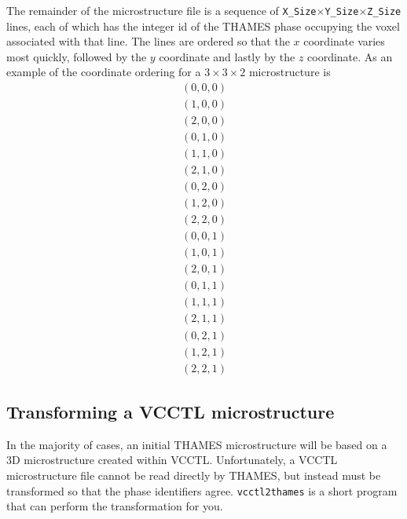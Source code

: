\documentclass{article}
\begin{document}
The remainder of the microstructure file is a sequence of
\verb!X_Size!$\times$\verb!Y_Size!$\times$\verb!Z_Size! lines, each of which has
the integer id of the THAMES phase occupying
the voxel associated with that line.  The lines are ordered so that the $x$
coordinate varies most quickly, followed by the $y$ coordinate and lastly by
the $z$ coordinate.  As an example of the coordinate ordering for a $3 \times 3 \times 2$
microstructure is
\begin{align*}
(0,0,0) \\
(1,0,0) \\
(2,0,0) \\
(0,1,0) \\
(1,1,0) \\
(2,1,0) \\
(0,2,0) \\
(1,2,0) \\
(2,2,0) \\
(0,0,1) \\
(1,0,1) \\
(2,0,1) \\
(0,1,1) \\
(1,1,1) \\
(2,1,1) \\
(0,2,1) \\
(1,2,1) \\
(2,2,1)
\end{align*}

\subsection{Transforming a VCCTL microstructure}
In the majority of cases, an initial THAMES microstructure will be based on a 3D
microstructure created within VCCTL.  Unfortunately, a VCCTL microstructure file
cannot be read directly by THAMES, but instead must be transformed so that the
phase identifiers agree.  \texttt{vcctl2thames} is a short program that can perform the
transformation for you.


\end{document}
